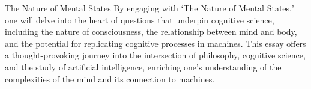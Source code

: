 \begin{notes}{The Nature of Mental States}
    By engaging with `The Nature of Mental States,' one will delve into the heart of questions that underpin cognitive science, including the nature of consciousness, the relationship between mind and body, 
    and the potential for replicating cognitive processes in machines. This essay offers a thought-provoking journey into the intersection of philosophy, cognitive science, and the study of artificial 
    intelligence, enriching one's understanding of the complexities of the mind and its connection to machines.
\end{notes}